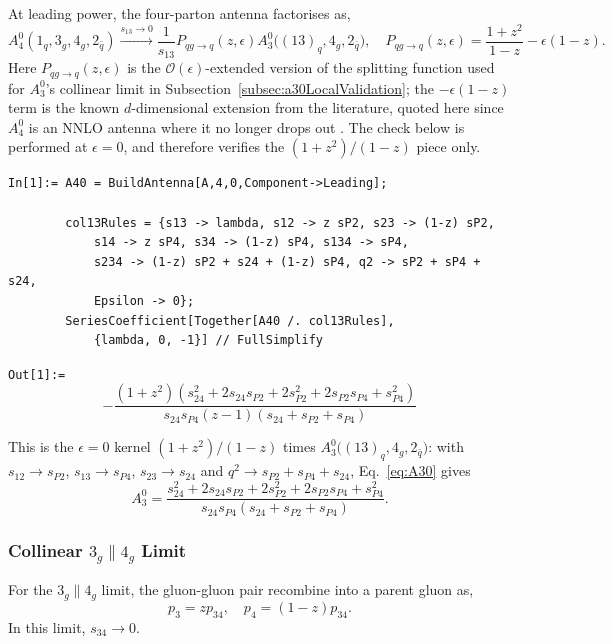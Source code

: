 At leading power, the four-parton antenna factorises as,
\begin{equation}
    A_4^0(1_q,3_g,4_g,2_{\bar q})\xrightarrow{s_{13}\to 0}\frac{1}{s_{13}}P_{qg\to q}(z,\epsilon)A_3^0\Big((13)_q,4_g,2_{\bar q}\Big),\quad P_{qg\to q}(z,\epsilon)=\frac{1+z^2}{1-z}-\epsilon(1-z).
\end{equation}
Here $P_{qg\to q}(z,\epsilon)$ is the $\mathcal O(\epsilon)$-extended version of the splitting
function used for $A_3^0$'s collinear limit in Subsection~\ref{subsec:a30LocalValidation}; the
$-\epsilon(1-z)$ term is the known $d$-dimensional extension from the literature, quoted here
since $A_4^0$ is an NNLO antenna where it no longer drops out \cite{Gehrmann-DeRidder:2005btv}.
The check below is performed at $\epsilon=0$, and therefore verifies the $(1+z^2)/(1-z)$ piece only.

\begin{mdframed}[backgroundcolor=gray!10, linewidth=0pt]
\begin{lstlisting}
In[1]:= A40 = BuildAntenna[A,4,0,Component->Leading];

        col13Rules = {s13 -> lambda, s12 -> z sP2, s23 -> (1-z) sP2,
            s14 -> z sP4, s34 -> (1-z) sP4, s134 -> sP4,
            s234 -> (1-z) sP2 + s24 + (1-z) sP4, q2 -> sP2 + sP4 + s24,
            Epsilon -> 0};
        SeriesCoefficient[Together[A40 /. col13Rules],
            {lambda, 0, -1}] // FullSimplify
\end{lstlisting}
\texttt{Out[1]:=}
    \begin{equation*}
        -\frac{(1+z^2)\left(s_{24}^2+2s_{24}s_{P2}+2s_{P2}^2+2s_{P2}s_{P4}+s_{P4}^2\right)}{s_{24}s_{P4}(z-1)(s_{24}+s_{P2}+s_{P4})}
    \end{equation*}
\end{mdframed}
This is the $\epsilon=0$ kernel $(1+z^2)/(1-z)$ times $A_3^0\big((13)_q,4_g,2_{\bar q}\big)$: with $s_{12}\to s_{P2}$,
$s_{13}\to s_{P4}$, $s_{23}\to s_{24}$ and $q^2\to s_{P2}+s_{P4}+s_{24}$, Eq.~\eqref{eq:A30} gives
\begin{equation*}
    A_3^0=\frac{s_{24}^2+2s_{24}s_{P2}+2s_{P2}^2+2s_{P2}s_{P4}+s_{P4}^2}{s_{24}s_{P4}(s_{24}+s_{P2}+s_{P4})}.
\end{equation*}


\subsubsection{Collinear $3_g\parallel 4_g$ Limit}

For the $3_g\parallel 4_g$ limit, the gluon-gluon pair recombine into a parent gluon as,
\begin{equation}
    p_3=zp_{34},\quad p_4=(1-z)p_{34}.
\end{equation}
In this limit, $s_{34}\to 0$.

